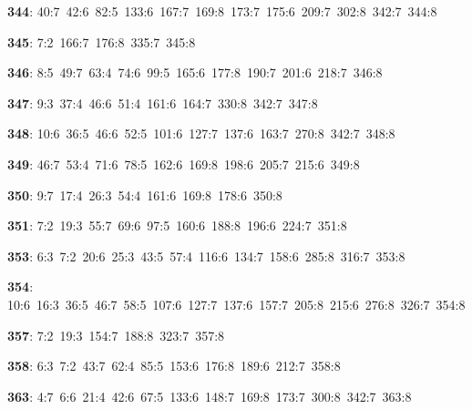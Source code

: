 \noindent \textbf{344}: 40:7\allowbreak\ 42:6\allowbreak\ 82:5\allowbreak\ 133:6\allowbreak\ 167:7\allowbreak\ 169:8\allowbreak\ 173:7\allowbreak\ 175:6\allowbreak\ 209:7\allowbreak\ 302:8\allowbreak\ 342:7\allowbreak\ 344:8\par
\noindent \textbf{345}: 7:2\allowbreak\ 166:7\allowbreak\ 176:8\allowbreak\ 335:7\allowbreak\ 345:8\par
\noindent \textbf{346}: 8:5\allowbreak\ 49:7\allowbreak\ 63:4\allowbreak\ 74:6\allowbreak\ 99:5\allowbreak\ 165:6\allowbreak\ 177:8\allowbreak\ 190:7\allowbreak\ 201:6\allowbreak\ 218:7\allowbreak\ 346:8\par
\noindent \textbf{347}: 9:3\allowbreak\ 37:4\allowbreak\ 46:6\allowbreak\ 51:4\allowbreak\ 161:6\allowbreak\ 164:7\allowbreak\ 330:8\allowbreak\ 342:7\allowbreak\ 347:8\par
\noindent \textbf{348}: 10:6\allowbreak\ 36:5\allowbreak\ 46:6\allowbreak\ 52:5\allowbreak\ 101:6\allowbreak\ 127:7\allowbreak\ 137:6\allowbreak\ 163:7\allowbreak\ 270:8\allowbreak\ 342:7\allowbreak\ 348:8\par
\noindent \textbf{349}: 46:7\allowbreak\ 53:4\allowbreak\ 71:6\allowbreak\ 78:5\allowbreak\ 162:6\allowbreak\ 169:8\allowbreak\ 198:6\allowbreak\ 205:7\allowbreak\ 215:6\allowbreak\ 349:8\par
\noindent \textbf{350}: 9:7\allowbreak\ 17:4\allowbreak\ 26:3\allowbreak\ 54:4\allowbreak\ 161:6\allowbreak\ 169:8\allowbreak\ 178:6\allowbreak\ 350:8\par
\noindent \textbf{351}: 7:2\allowbreak\ 19:3\allowbreak\ 55:7\allowbreak\ 69:6\allowbreak\ 97:5\allowbreak\ 160:6\allowbreak\ 188:8\allowbreak\ 196:6\allowbreak\ 224:7\allowbreak\ 351:8\par
\noindent \textbf{353}: 6:3\allowbreak\ 7:2\allowbreak\ 20:6\allowbreak\ 25:3\allowbreak\ 43:5\allowbreak\ 57:4\allowbreak\ 116:6\allowbreak\ 134:7\allowbreak\ 158:6\allowbreak\ 285:8\allowbreak\ 316:7\allowbreak\ 353:8\par
\noindent \textbf{354}: 10:6\allowbreak\ 16:3\allowbreak\ 36:5\allowbreak\ 46:7\allowbreak\ 58:5\allowbreak\ 107:6\allowbreak\ 127:7\allowbreak\ 137:6\allowbreak\ 157:7\allowbreak\ 205:8\allowbreak\ 215:6\allowbreak\ 276:8\allowbreak\ 326:7\allowbreak\ 354:8\par
\noindent \textbf{357}: 7:2\allowbreak\ 19:3\allowbreak\ 154:7\allowbreak\ 188:8\allowbreak\ 323:7\allowbreak\ 357:8\par
\noindent \textbf{358}: 6:3\allowbreak\ 7:2\allowbreak\ 43:7\allowbreak\ 62:4\allowbreak\ 85:5\allowbreak\ 153:6\allowbreak\ 176:8\allowbreak\ 189:6\allowbreak\ 212:7\allowbreak\ 358:8\par
\noindent \textbf{363}: 4:7\allowbreak\ 6:6\allowbreak\ 21:4\allowbreak\ 42:6\allowbreak\ 67:5\allowbreak\ 133:6\allowbreak\ 148:7\allowbreak\ 169:8\allowbreak\ 173:7\allowbreak\ 300:8\allowbreak\ 342:7\allowbreak\ 363:8\par
